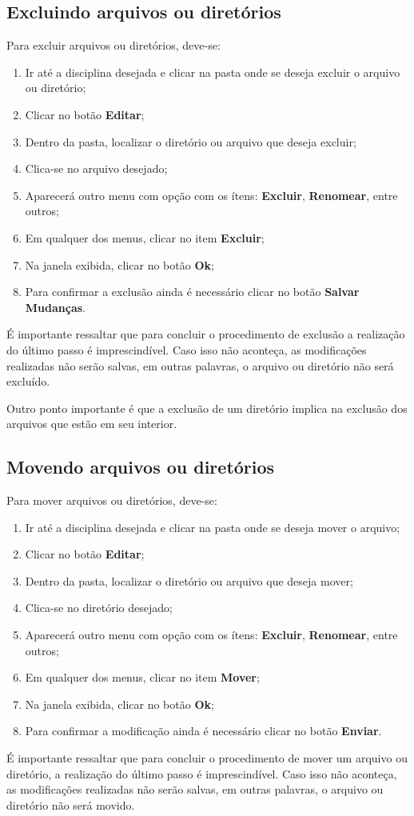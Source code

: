 \subsection{Excluindo arquivos ou diretórios}

Para excluir arquivos ou diretórios, deve-se:

\begin{enumerate}
\item Ir até a disciplina desejada e clicar na pasta onde se deseja excluir o arquivo ou diretório;
\item Clicar no botão \textbf{Editar};
\item Dentro da pasta, localizar o diretório ou arquivo que deseja excluir;
\item Clica-se no arquivo desejado;
\item Aparecerá outro menu com opção com os ítens: \textbf{Excluir}, \textbf{Renomear}, entre outros;
\item Em qualquer dos menus, clicar no item \textbf{Excluir};
\item Na janela exibida, clicar no botão \textbf{Ok};
\item Para confirmar a exclusão ainda é necessário clicar no botão \textbf{Salvar Mudanças}.
\end{enumerate}
É importante ressaltar que para concluir o procedimento de exclusão a realização do último passo é imprescindível. Caso isso não aconteça, as modificações realizadas não serão salvas, em outras palavras, o arquivo ou diretório não será excluído.

Outro ponto importante é que a exclusão de um diretório implica na exclusão dos arquivos que estão em seu interior.

\subsection{Movendo arquivos ou diretórios}
Para mover arquivos ou diretórios, deve-se:
\begin{enumerate}
\item Ir até a disciplina desejada e clicar na pasta onde se deseja mover o arquivo;
\item Clicar no botão \textbf{Editar};
\item Dentro da pasta, localizar o diretório ou arquivo que deseja mover;
\item Clica-se no diretório desejado;
\item Aparecerá outro menu com opção com os ítens: \textbf{Excluir}, \textbf{Renomear}, entre outros;
\item Em qualquer dos menus, clicar no item \textbf{Mover};
\item Na janela exibida, clicar no botão \textbf{Ok};
\item Para confirmar a modificação ainda é necessário clicar no botão \textbf{Enviar}.
\end{enumerate}
É importante ressaltar que para concluir o procedimento de mover um arquivo ou diretório, a realização do último passo é imprescindível. Caso isso não aconteça, as modificações realizadas não serão salvas, em outras palavras, o arquivo ou diretório não será movido.


